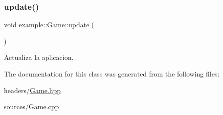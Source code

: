 \subsubsection{\texorpdfstring{update()}{update()}}
{\footnotesize\ttfamily void example\+::\+Game\+::update (\begin{DoxyParamCaption}{ }\end{DoxyParamCaption})}



Actualiza la aplicacion. 



The documentation for this class was generated from the following files\+:\begin{DoxyCompactItemize}
\item 
headers/\mbox{\hyperlink{_game_8hpp}{Game.\+hpp}}\item 
sources/Game.\+cpp\end{DoxyCompactItemize}
